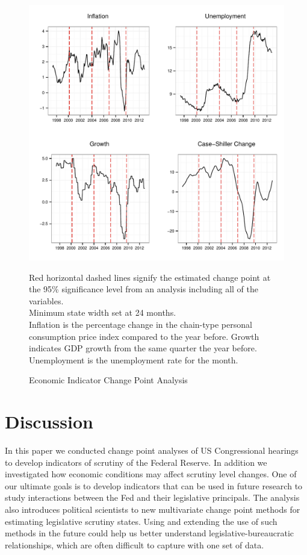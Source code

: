 \documentclass[a4paper]{article}\usepackage[]{graphicx}\usepackage[]{color}
\newenvironment{knitrout}{}{} %
\begin{document}
\begin{figure}
    \caption{Economic Indicator Change Point Analysis}
    \label{fig:FullEconCP}
\begin{knitrout}
\color{fgcolor}

{\centering \includegraphics[width=0.8\linewidth]{figure/EconFullCP} 

}



\end{knitrout}
{\scriptsize{Red horizontal dashed lines signify the estimated change point at the 95\% significance level from an analysis including all of the variables.\\
Minimum state width set at 24 months. \\
Inflation is the percentage change in the chain-type personal consumption price index compared to the year before. Growth indicates GDP growth from the same quarter the year before. Unemployment is the unemployment rate for the month.}}
\end{figure}


\section{Discussion}

In this paper we conducted change point analyses of US Congressional hearings to develop indicators of scrutiny of the Federal Reserve. In addition we investigated how economic conditions may affect scrutiny level changes. One of our ultimate goals is to develop indicators that can be used in future research to study interactions between the Fed and their legislative principals. The analysis also introduces political scientists to new multivariate change point methods for estimating legislative scrutiny states. Using and extending the use of such methods in the future could help us better understand legislative-bureaucratic relationships, which are often difficult to capture with one set of data.
\end{document}
